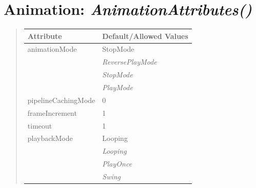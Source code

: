 \documentclass[letterpaper,10pt,english]{sphinxmanual}
\begin{document}
\begin{DUlineblock}{0em}
\item[] 
\end{DUlineblock}

\begin{DUlineblock}{0em}
\item[] 
\end{DUlineblock}


\section{\textbf{Animation}: \emph{AnimationAttributes()}}
\label{attributes:animation-animationattributes}
\begin{DUlineblock}{0em}
\item[] 
\end{DUlineblock}
\begin{quote}

\begin{tabulary}{\linewidth}{|L|L|}
\hline

\textbf{Attribute}
 & 
\textbf{Default/Allowed Values}
\\
\hline
animationMode
 & 
StopMode
\\
\hline & 
\emph{ReversePlayMode}
\\
\hline & 
\emph{StopMode}
\\
\hline & 
\emph{PlayMode}
\\
\hline
pipelineCachingMode
 & 
0
\\
\hline
frameIncrement
 & 
1
\\
\hline
timeout
 & 
1
\\
\hline
playbackMode
 & 
Looping
\\
\hline & 
\emph{Looping}
\\
\hline & 
\emph{PlayOnce}
\\
\hline & 
\emph{Swing}
\\
\hline\end{tabulary}

\end{quote}

\begin{DUlineblock}{0em}
\item[] 
\end{DUlineblock}

\begin{DUlineblock}{0em}
\item[] 
\end{DUlineblock}
\end{document}
